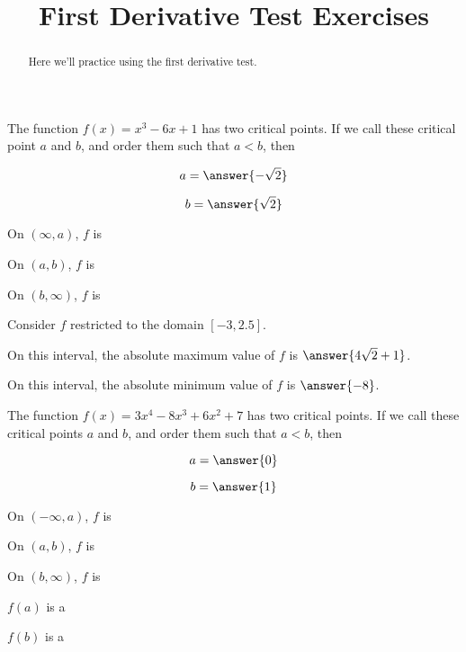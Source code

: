 \documentclass[handout]{ximera}
\title{First Derivative Test Exercises}
\begin{document}
\begin{abstract}
  Here we'll practice using the first derivative test.
\end{abstract}
\maketitle

\begin{exercise}
The function $f(x) = x^3-6x+1$ has two critical points.  If we call these critical point $a$ and $b$, and order them such that $a < b$, then

$$
a = \answer{-\sqrt{2}}
$$

$$
b=\answer{\sqrt{2}}
$$

On $(\infty,a)$, $f$ is 

On $(a,b)$, $f$ is 

On $(b,\infty)$, $f$ is 


Consider $f$ restricted to the domain $[-3,2.5]$.

On this interval, the absolute maximum value of $f$ is $\answer{4\sqrt{2}+1}$.

On this interval, the absolute minimum value of $f$ is $\answer{-8}$.

\end{exercise}


\begin{exercise}
The function $f(x) = 3x^4-8x^3+6x^2+7$ has two critical points.  If we
call these critical points $a$ and $b$, and order them such that $a <
b $, then

$$
a = \answer{0}
$$

$$
b=\answer{1}
$$



On $(-\infty,a)$, $f$ is 

On $(a,b)$, $f$ is 

On $(b,\infty)$, $f$ is 


$f(a)$ is a 

$f(b)$ is a 


\end{exercise}
\end{document}
